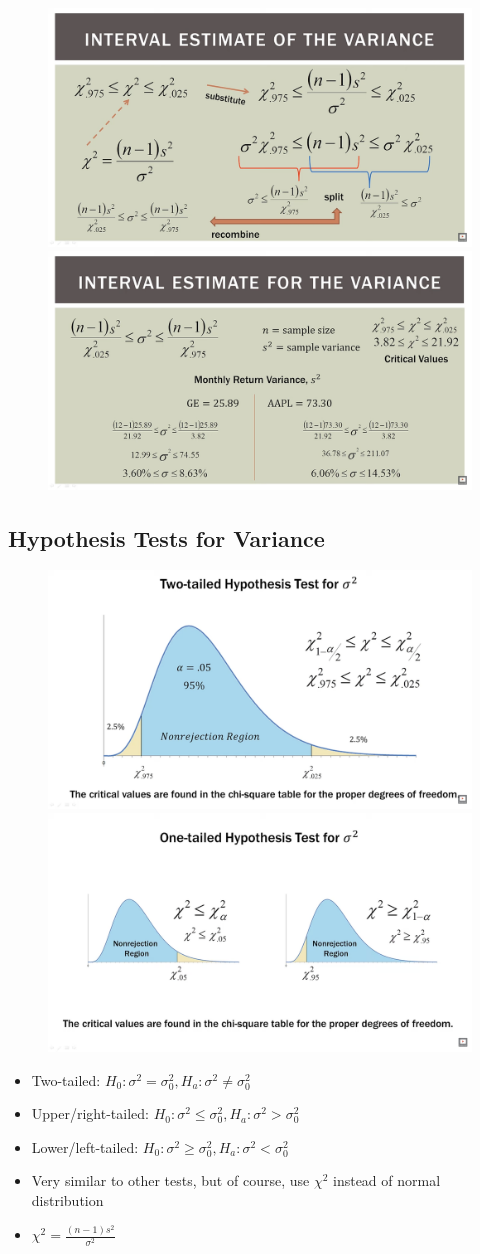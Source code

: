 \documentclass{article}
\begin{document}
\begin{figure}[H]
    \centering
    \includegraphics[width=0.45\linewidth]{images/civarianceexample.png}
    \hfill %
    \includegraphics[width=0.45\linewidth]{images/civarianceexample2.png}
\end{figure}

\subsection{Hypothesis Tests for Variance}

\begin{figure}[H]
    \centering
    \includegraphics[width=0.45\linewidth]{images/varhtesttwotail.png}
    \hfill %
    \includegraphics[width=0.45\linewidth]{images/varhtestonetail.png}
\end{figure}

\begin{itemize}
    \item Two-tailed: $H_0: \sigma^2 = \sigma_0^2, H_a: \sigma^2 \ne \sigma_0^2$
    \item Upper/right-tailed: $H_0: \sigma^2 \leq \sigma_0^2, H_a: \sigma^2 > \sigma_0^2$
    \item Lower/left-tailed: $H_0: \sigma^2 \geq \sigma_0^2, H_a: \sigma^2 < \sigma_0^2$
    \item Very similar to other tests, but of course, use $\chi^2$ instead of normal distribution
    \item $\chi^2=\frac{(n-1)s^2}{\sigma^2}$
\end{itemize}
\end{document}
